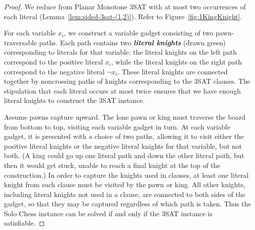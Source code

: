 \documentclass[11pt,letterpaper]{article}
\def\defn#1{\textbf{\textit{\boldmath #1}}}
\theoremstyle{plain}
\theoremstyle{definition}
\theoremstyle{remark}
\numberwithin{equation}{section}
\begin{document}
\begin{proof}
  We reduce from Planar Monotone 3SAT with at most two occurrences
  of each literal (Lemma~\ref{lem:sided-3sat-(1,2)}).
  Refer to Figure~\ref{fig:1KingKnight}.

  For each variable \(x_i\), we construct a variable gadget
  consisting of two pawn-traversable paths.
  Each path contains two \defn{literal knights} (drawn green)
  corresponding to literals for that variable:
  the literal knights on the left path correspond to the positive literal \(x_i\),
  while the literal knights on the right path correspond to the negative literal \(\neg x_i\).
  These literal knights are connected together by noncrossing paths of knights corresponding to the 3SAT clauses.
  The stipulation that each literal occurs at most twice ensures that we have enough literal knights to construct the 3SAT instance.

  Assume pawns capture upward.
  The lone pawn or king must traverse the board from bottom to top,
  visiting each variable gadget in turn.
  At each variable gadget, it is presented with a choice of two paths,
  allowing it to visit either the positive literal knights
  or the negative literal knights for that variable, but not both.
  (A king could go up one literal path and down the other literal path,
  but then it would get stuck, unable to reach a final knight at the top
  of the construction.)
  In order to capture the knights used in clauses,
  at least one literal knight from each clause must be visited by the
  pawn or king.
  All other knights, including literal knights not used in a clause,
  are connected to both sides of the gadget,
  so that they may be captured regardless of which path is taken.
  Thus the Solo Chess instance can be solved if and only if
  the 3SAT instance is satisfiable.
\end{proof}
\end{document}
